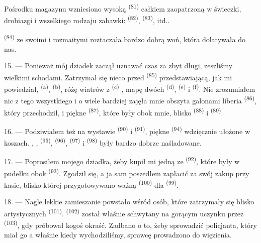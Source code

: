Pośrodku magazynu wzniesiono wysoką  \textsuperscript{(81)} całkiem
zaopatrzoną w świeczki, drobiazgi i wszelkiego rodzaju zabawki: 
\textsuperscript{(82)},  \textsuperscript{(83)}, itd..

 \textsuperscript{(84)} ze swoimi  i
rozmaitymi  roztaczała bardzo dobrą woń, która dolatywała do nas.

\VUsaut{3.4mm}
\VUsaut{2.8mm}

15. --- Ponieważ mój dziadek zaczął uznawać czas za zbyt długi, zeszliśmy wielkimi
schodami. Zatrzymał się nieco przed  \textsuperscript{(85)}
przedstawiającą, jak mi powiedział,  \textsuperscript{(a)},
 \textsuperscript{(b)}, różę wiatrów z
 \textsuperscript{(c)} , mapę dwóch  \textsuperscript{(d)},
 \textsuperscript{(e)} i  \textsuperscript{(f)}.
Nie zrozumiałem nic z tego wszystkiego i o wiele bardziej zajęła mnie obszyta galonami
liberia  \textsuperscript{(86)}, który przechodził, i piękne
 \textsuperscript{(87)}, które były obok mnie, blisko
 \textsuperscript{(88)} i  \textsuperscript{(89)}.

16. --- Podziwiałem też na wystawie  \textsuperscript{(90)} i
 \textsuperscript{(91)}, piękne 
\textsuperscript{(94)} wdzięcznie ułożone w koszach. ,
,  \textsuperscript{(95)}, 
\textsuperscript{(96)},  \textsuperscript{(97)} i 
\textsuperscript{(98)} były bardzo dobrze naśladowane.

\VUsaut{4.4mm}
\VUsaut{2.8mm}

17. --- Poprosiłem mojego dziadka, żeby kupił mi jedną ze 
\textsuperscript{(92)}, które były w pudełku obok 
\textsuperscript{(93)}. Zgodził się, a ja sam poszedłem zapłacić za swój zakup przy
kasie, blisko której przygotowywano ważną  \textsuperscript{(100)} dla
 \textsuperscript{(99)}.

18. --- Nagle lekkie zamieszanie powstało wśród osób, które zatrzymały się blisko
artystycznych  \textsuperscript{(101)}. 
\textsuperscript{(102)} został właśnie schwytany na gorącym uczynku przez
 \textsuperscript{(103)}, gdy próbował kogoś okraść. Zadbano o to,
żeby sprowadzić policjanta, który miał go  a właśnie kiedy
wychodziliśmy, sprawcę prowadzono do więzienia.
\VUsaut{6.0mm}
\VUfilet{22mm}
